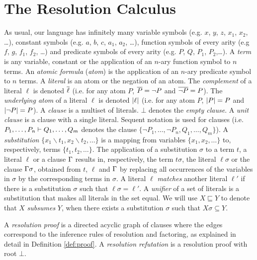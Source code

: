 \section{The Resolution Calculus}
\label{sec:res}

As usual, our language has infinitely many variable symbols (e.g. $x$, $y$, $z$, $x_1$, $x_2$, \ldots), constant symbols (e.g. $a$, $b$, $c$, $a_1$, $a_2$, \ldots), function symbols of every arity (e.g $f$, $g$, $f_1$, $f_2$, \ldots) and predicate symbols of every arity (e.g. $P$, $Q$, $P_1$, $P_2$,\ldots). A \emph{term} is any variable, constant or the application of an $n$-ary function symbol to $n$ terms.
An \emph{atomic formula} (\emph{atom}) is the application of an $n$-ary predicate symbol to $n$ terms. A \emph{literal} is an atom or the negation of an atom. The
\emph{complement} of a literal $\ell$ is denoted $\overline{\ell}$ (i.e. for any atom $P$,
$\overline{P} = \neg P$ and $\overline{\neg P} = P$). The \emph{underlying atom} of a literal $\ell$ is denoted $\lvert\ell\rvert$ (i.e. for any atom $P$, $\lvert P\rvert = P$ and $\lvert\neg P\rvert = P$). A
\emph{clause} is a multiset of literals. $\bot$ denotes the \emph{empty clause}. A \emph{unit clause} is a clause with a single literal. Sequent notation is used for clauses (i.e. $P_1,\ldots,P_n \vdash Q_1,\ldots, Q_m$ denotes the clause $\{ \neg P_1,\ldots, \neg P_n, Q_1, \ldots, Q_m \}$).
A \emph{substitution} $\{ x_1\backslash t_1, x_2 \backslash t_2, \ldots \}$ is a mapping from variables $\{ x_1, x_2, \ldots \}$ to, respectively, terms $\{t_1, t_2, \ldots \}$. The application of a substitution $\sigma$ to a term $t$, a literal $\ell$ or a clause $\Gamma$ results in, respectively, the term $t \sigma$, the literal $\ell \sigma$ or the clause $\Gamma \sigma$, obtained from $t$, $\ell$ and $\Gamma$ by replacing all occurrences of the variables in $\sigma$ by the corresponding terms in $\sigma$. A literal $\ell$ \emph{matches} another literal $\ell'$ if there is a substitution $\sigma$ such that $\ell\sigma=\ell'$. A \emph{unifier} of a set of literals is a substitution that makes all literals in the set equal. We will use $X \sqsubseteq Y$ to denote that $X$ \emph{subsumes} $Y$, when there exists a substitution $\sigma$ such that $X\sigma \subseteq Y$.


A \emph{resolution proof} is a directed acyclic graph of clauses where the edges correspond to the inference rules of resolution and factoring, as explained in detail in Definition \ref{def:proof}. A \emph{resolution refutation} is a resolution proof with root $\bot$.

